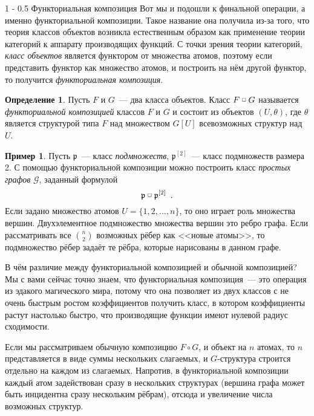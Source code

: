 \documentclass[a5paper]{article}
\makeatletter
\def \fprod {\; \raisebox{.3\height}{\scalebox{0.6}{$\square$}}\; }
\theoremstyle{definition}
\newtheorem{example}{Пример}
\newtheorem*{definition}{Определение}
\renewcommand{\subsection}{\@startsection
{subsection}%
{1}%
{\z@}%
{-\baselineskip}%
{0.5\baselineskip}%
{\centering\large\scshape}} %
\makeatother
\begin{document}
\subsection{Функториальная композиция}
Вот мы и подошли к финальной операции, а именно функториальной композиции. Такое
название она получила из-за того, что теория классов объектов возникла
естественным образом как применение теории категорий к аппарату производящих
функций. С точки зрения теории категорий, \textit{класс объектов} является
функтором от множества атомов, поэтому если представить функтор как множество
атомов, и построить на нём другой функтор, то получится \textit{функториальная
композиция}.

\begin{definition}
    Пусть \( F \) и \( G \)~--- два класса объектов. Класс \( F \fprod G \) 
называется \textit{функториальной композицией} классов \( F \) и \( G \) и
состоит из объектов \( (U, \theta) \), где \( \theta \) является структурой типа
\( F \) над множеством \( G[U] \) всевозможных структур над \( U \).
\end{definition}

\begin{example}
    Пусть \( \mathfrak p \)~--- класс \textit{подмножеств}, \( \mathfrak p^{[2]}
\)~--- класс подмножеств размера 2.
    С помощью функториальной композиции можно построить класс \textit{простых
графов} \( \mathcal G \), заданный формулой
\[
    \mathfrak p \fprod \mathfrak p^{[2]}
    \enspace  .
\]
Если задано множество атомов \( U = \{1, 2, \ldots, n \} \), то оно играет роль
множества вершин. Двухэлементное подмножество множества вершин это ребро графа.
Если рассматривать все \( {n \choose 2} \) возможных рёбер как <<новые атомы>>,
то подмножество рёбер задаёт те рёбра, которые нарисованы в данном графе.
\end{example}

В чём различие между функториальной композицией и обычной композицией? Мы с вами
сейчас точно знаем, что функториальная композиция~--- это операция из эдакого
магического мира, потому что она позволяет из двух классов с не очень быстрым
ростом коэффициентов получить класс, в котором коэффициенты растут настолько
быстро, что производящие функции имеют нулевой радиус сходимости.

Если мы рассматриваем обычную композицию \( F \circ G \), и объект на \( n \)
атомах, то \( n \) представляется в виде суммы нескольких слагаемых, и \( G
\)-структура строится отдельно на каждом из слагаемых. Напротив, в
функториальной композиции каждый атом задействован сразу в нескольких структурах
(вершина графа может быть инцидентна сразу нескольким рёбрам), отсюда и увеличение
числа возможных структур.
\end{document}
